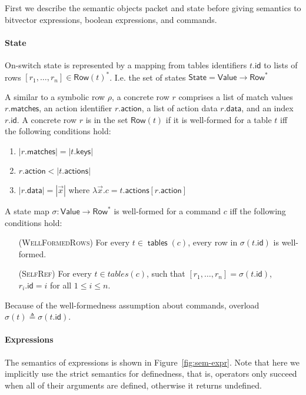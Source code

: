 \documentclass{article}
\newcommand{\Value}{\mathsf{Value}}
\newcommand{\Row}{\mathsf{Row}}
\newcommand{\State}{\mathsf{State}}
\newcommand{\matches}{\mathsf{matches}}
\newcommand{\action}{\mathsf{action}}
\newcommand{\actions}{\mathsf{actions}}
\newcommand{\keys}{\mathsf{keys}}
\newcommand{\data}{\mathsf{data}}
\newcommand{\id}{\mathsf{id}}
\newcommand{\tables}{\mathop{\mathsf{tables}}}
\theoremstyle{plain}
\theoremstyle{definition}
\theoremstyle{remark}
\begin{document}
First we describe the semantic objects packet and state before giving semantics
to bitvector expressions, boolean expressions, and commands.


\paragraph{State}
On-switch state is represented by a mapping from tables identifiers $t.\id$ to
lists of rows $[r_1,\ldots,r_n] \in \Row(t)^*$. I.e. the set of states $\State =
\Value \to \Row^*$

A similar to a symbolic row $\rho$, a concrete row $r$ comprises a list of match
values $r.\matches$, an action identifier $r.\action$, a list of action data
$r.\data$, and an index $r.\id$. A concrete row $r$ is in the set $\Row(t)$ if
it is well-formed for a table $t$ iff the following conditions hold:
\begin{enumerate}
\item $|r.\matches| = |t.\keys|$
\item $r.\action < |t.\actions|$
\item $|r.\data| = |\vec x|$ where $\lambda \vec x. c = t.\actions[r.\action]$
\end{enumerate}

A state map $\sigma : \Value \to \Row^*$ is well-formed for a command $c$ iff
the following conditions hold:
\begin{enumerate}[align=left]
\item[(\textsc{WellFormedRows})] For every $t\in \tables(c)$, every row in $\sigma(t.\id)$ is well-formed.
\item[(\textsc{SelfRef})] For every $t \in tables(c)$, such that $[r_1,\ldots,
  r_n] = \sigma(t.\id)$, $r_i.\id = i$ for all $1 \leq i \leq n$.
\end{enumerate}

Because of the well-formedness assumption about commands, overload $\sigma(t)
\triangleq \sigma(t.\id)$.

\paragraph{Expressions}
The semantics of expressions is shown in Figure~\ref{fig:sem-expr}. Note that
here we implicitly use the strict semantics for definedness, that is, operators
only succeed when all of their arguments are defined, otherwise it returns
undefined.
\end{document}
